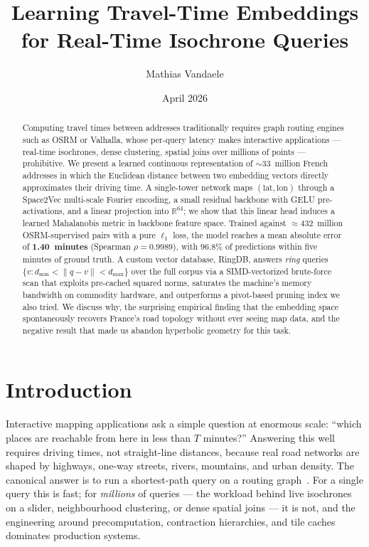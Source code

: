 \documentclass[11pt,a4paper]{article}
\title{\textbf{Learning Travel-Time Embeddings\\
for Real-Time Isochrone Queries}}
\author{Mathias Vandaele}
\affil{Independent Research\\ \texttt{mathias.vandaele@pm.me}}
\date{April 2026}
\begin{document}
\maketitle

\begin{abstract}
Computing travel times between addresses traditionally requires graph
routing engines such as OSRM or Valhalla, whose per-query latency makes
interactive applications --- real-time isochrones, dense clustering,
spatial joins over millions of points --- prohibitive. We present a
learned continuous representation of $\sim$33~million French addresses
in which the Euclidean distance between two embedding vectors directly
approximates their driving time. A single-tower network maps
$(\text{lat},\text{lon})$ through a Space2Vec multi-scale Fourier
encoding, a small residual backbone with GELU pre-activations, and a
linear projection into $\mathbb{R}^{64}$; we show that this linear head
induces a learned Mahalanobis metric in backbone feature space. Trained
against $\approx$432~million OSRM-supervised pairs with a pure $\ell_1$
loss, the model reaches a mean absolute error of \textbf{1.40~minutes}
(Spearman $\rho = 0.9989$), with $96.8\%$ of predictions within five
minutes of ground truth. A custom vector database, RingDB, answers
\emph{ring} queries
$\{v : d_\text{min} < \|q - v\| < d_\text{max}\}$ over the full corpus
via a SIMD-vectorized brute-force scan that exploits pre-cached
squared norms, saturates the machine's memory bandwidth on commodity
hardware, and outperforms a pivot-based pruning index we also tried.
We discuss why, the surprising empirical finding that the embedding
space spontaneously recovers France's road topology without ever
seeing map data, and the negative result that made us abandon
hyperbolic geometry for this task.
\end{abstract}

\section{Introduction}

Interactive mapping applications ask a simple question at enormous
scale: ``which places are reachable from here in less than $T$
minutes?'' Answering this well requires driving times, not
straight-line distances, because real road networks are shaped by
highways, one-way streets, rivers, mountains, and urban density. The
canonical answer is to run a shortest-path query on a routing
graph~\cite{luxen2011osrm,valhalla}. For a single query this is fast;
for \emph{millions} of queries --- the workload behind live isochrones
on a slider, neighbourhood clustering, or dense spatial joins --- it
is not, and the engineering around precomputation, contraction
hierarchies, and tile caches dominates production systems.
\end{document}
